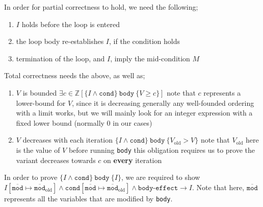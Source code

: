 \documentclass[a4paper, 12pt]{article}
\begin{document}
                In order for partial correctness to hold, we need the following;
                \begin{enumerate}[1.]
                    \itemsep0em
                    \item $I$ holds before the loop is entered
                    \item the loop body re-establishes $I$, if the condition holds
                    \item termination of the loop, and $I$, imply the mid-condition $M$
                \end{enumerate}
                Total correctness needs the above, as well as;
                \begin{enumerate}[1.]
                    \itemsep0em
                    \setcounter{enumi}{3}
                    \item $V$ is bounded
                        \subitem $\exists c \in \mathbb{Z} [\{I \land \texttt{cond}\}\ \texttt{body}\ \{V \geq c\}]$
                        \subitem note that $c$ represents a lower-bound for $V$, since it is decreasing
                        \subitem generally any well-founded ordering with a limit works, but we will mainly look for an integer expression with a fixed lower bound (normally 0 in our cases)
                    \item $V$ decreases with each iteration
                        \subitem $\{I \land \texttt{cond}\}\ \texttt{body}\ \{V_\text{old} > V\}$
                        \subitem note that $V_\text{old}$ here is the value of $V$ before running \texttt{body}
                        \subitem this obligation requires us to prove the variant decreases towards $c$ on \textbf{every} iteration
                \end{enumerate}
                In order to prove $\{ I \land \texttt{cond} \}\ \texttt{body}\ \{ I \}$, we are required to show $I[\overline{\texttt{mod}} \mapsto \overline{\texttt{mod}}_\text{old}] \land \texttt{cond}[\overline{\texttt{mod}} \mapsto \overline{\texttt{mod}}_\text{old}] \land \texttt{body-effect} \rightarrow I$. Note that here, $\overline{\texttt{mod}}$ represents all the variables that are modified by \texttt{body}.
                \medskip
\end{document}
